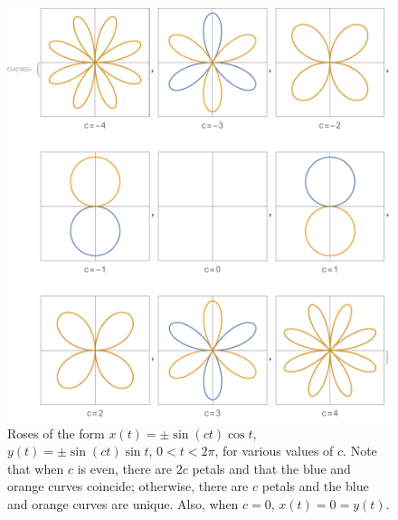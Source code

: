 \documentclass[12pt]{article}
\begin{document}
	\begin{figure}[h!]
		\begin{center}
			\includegraphics[trim={19mm 0 3mm 0}, clip, scale=0.875]{7_Roses3}
			\caption{Roses of the form $x(t)=\pm\sin(ct)\cos{t}$, $y(t)=\pm\sin(ct)\sin{t}$, $0<t<2\pi$, for various values of $c$. Note that when $c$ is even, there are $2c$ petals and that the blue and orange curves coincide; otherwise, there are $c$ petals and the blue and orange curves are unique. Also, when $c=0$, $x(t)=0=y(t)$.}
			\label{fig:roses3}
		\end{center}
	\end{figure}
\end{document}
